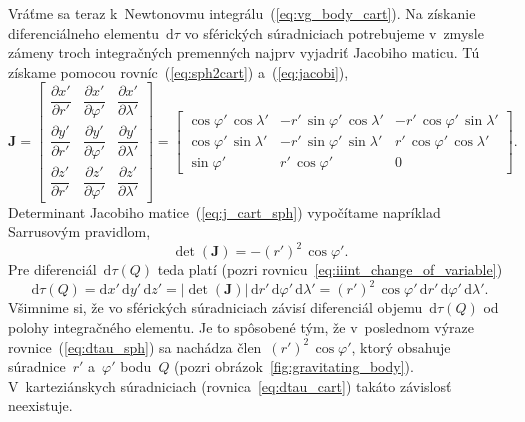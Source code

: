\documentclass[a4paper, 12pt]{book}
\newcommand{\diff}{\mathrm d}
\begin{document}
Vráťme sa teraz k~Newtonovmu integrálu~(\ref{eq:vg_body_cart}).  Na získanie 
diferenciálneho elementu~$\diff \tau$ vo sférických súradniciach potrebujeme 
v~zmysle zámeny troch integračných premenných najprv vyjadriť Jacobiho maticu.  
Tú získame pomocou rovníc~(\ref{eq:sph2cart}) a~(\ref{eq:jacobi}),
%
\begin{equation}
\label{eq:j_cart_sph}
\mathbf{J} =
\begin{bmatrix}
\dfrac{\partial x'}{\partial{r'}} & \dfrac{\partial x'}{\partial \varphi'} 
& \dfrac{\partial x'}{\partial \lambda'}\\[2ex]
%
\dfrac{\partial y'}{\partial{r'}} & \dfrac{\partial y'}{\partial{\varphi'}} 
& \dfrac{\partial y'}{\partial \lambda'}\\[2ex]
%
\dfrac{\partial z'}{\partial{r'}} & \dfrac{\partial z'}{\partial{\varphi'}} 
& \dfrac{\partial z'}{\partial \lambda'}
\end{bmatrix}
%
=
%
\begin{bmatrix}
\cos\varphi' \, \cos\lambda' & -r' \, \sin\varphi' \, \cos\lambda' & -r' \, 
\cos\varphi' \, \sin\lambda'
\\[2ex]
\cos\varphi' \, \sin\lambda' & -r' \, \sin\varphi' \, \sin\lambda' &  r' \, 
\cos\varphi' \, \cos\lambda'
\\[2ex]
 \sin\varphi'                & r' \, \cos\varphi'                  & 0
\end{bmatrix}
%
{.}
%
\end{equation}
%
Determinant Jacobiho matice~(\ref{eq:j_cart_sph}) vypočítame napríklad 
Sarrusovým pravidlom,
%
\begin{equation}
\det (\mathbf{J}) = -(r')^2 \, \cos\varphi'{.}
\end{equation}
%
Pre diferenciál~$\diff \tau(Q)$ teda platí (pozri 
rovnicu~\ref{eq:iiint_change_of_variable})
%
\begin{equation}
\label{eq:dtau_sph}
\diff \tau(Q) = \diff x' \, \diff y' \, \diff z' = | \det (\mathbf{J}) | \, 
\diff r' \, \diff \varphi' \, \diff \lambda' = (r')^2 \, \cos\varphi' \, \diff 
r' \, \diff \varphi' \, \diff \lambda'{.}
\end{equation}
%
Všimnime si, že vo sférických súradniciach závisí diferenciál objemu~$\diff 
\tau(Q)$ od polohy integračného elementu.  Je to spôsobené tým, že v~poslednom 
výraze rovnice~(\ref{eq:dtau_sph}) sa nachádza člen~$(r')^2 \, \cos\varphi'$, 
ktorý obsahuje súradnice~$r'$ a~$\varphi'$ bodu~$Q$ (pozri 
obrázok~\ref{fig:gravitating_body}).  V~karteziánskych súradniciach 
(rovnica~\ref{eq:dtau_cart}) takáto závislosť neexistuje.
\end{document}
